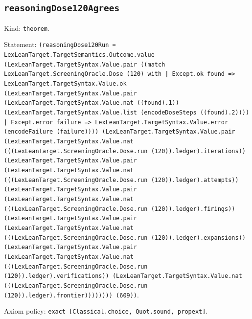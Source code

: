 \documentclass[11pt]{article}
\begin{document}
\subsection*{\texttt{reasoningDose120Agrees}}
\noindent Kind: \texttt{theorem}.\par
\noindent Statement: \texttt{(reasoningDose120Run = LexLeanTarget.TargetSemantics.Outcome.value (LexLeanTarget.TargetSyntax.Value.pair ((match LexLeanTarget.ScreeningOracle.Dose (120) with | Except.ok found => LexLeanTarget.TargetSyntax.Value.ok (LexLeanTarget.TargetSyntax.Value.pair (LexLeanTarget.TargetSyntax.Value.nat ((found).1)) (LexLeanTarget.TargetSyntax.Value.list (encodeDoseSteps ((found).2)))) | Except.error failure => LexLeanTarget.TargetSyntax.Value.error (encodeFailure (failure)))) (LexLeanTarget.TargetSyntax.Value.pair (LexLeanTarget.TargetSyntax.Value.nat (((LexLeanTarget.ScreeningOracle.Dose.run (120)).ledger).iterations)) (LexLeanTarget.TargetSyntax.Value.pair (LexLeanTarget.TargetSyntax.Value.nat (((LexLeanTarget.ScreeningOracle.Dose.run (120)).ledger).attempts)) (LexLeanTarget.TargetSyntax.Value.pair (LexLeanTarget.TargetSyntax.Value.nat (((LexLeanTarget.ScreeningOracle.Dose.run (120)).ledger).firings)) (LexLeanTarget.TargetSyntax.Value.pair (LexLeanTarget.TargetSyntax.Value.nat (((LexLeanTarget.ScreeningOracle.Dose.run (120)).ledger).expansions)) (LexLeanTarget.TargetSyntax.Value.pair (LexLeanTarget.TargetSyntax.Value.nat (((LexLeanTarget.ScreeningOracle.Dose.run (120)).ledger).verifications)) (LexLeanTarget.TargetSyntax.Value.nat (((LexLeanTarget.ScreeningOracle.Dose.run (120)).ledger).frontier)))))))) (609))}.\par
\noindent Axiom policy: \texttt{exact [Classical.choice, Quot.sound, propext]}.\par
\end{document}
